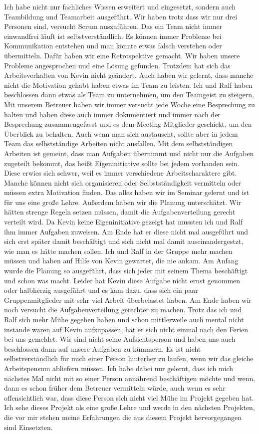 \noindent Ich habe nicht nur fachliches Wissen erweitert und eingesetzt, sondern auch Teambildung und Teamarbeit ausgeführt. Wir haben trotz dass wir nur drei Personen sind, versucht Scrum auszuführen.
Das ein Team nicht immer einwandfrei läuft ist selbstverständlich. 
Es können immer Probleme bei Kommunikation entstehen und man könnte etwas falsch verstehen oder übermitteln. 
Dafür haben wir eine Retrospektive gemacht. Wir haben unsere Probleme angesprochen und eine Lösung gefunden. Trotzdem hat sich das Arbeitsverhalten von Kevin nicht geändert.
Auch haben wir gelernt, dass manche nicht die Motivation gehabt haben etwas im Team zu leisten. Ich und Ralf haben beschlossen dann etwas als Team zu unternehmen, um den Teamgeist zu steigern. 
Mit unserem Betreuer haben wir immer versucht jede Woche eine Besprechung zu halten und haben diese auch immer dokumentiert und immer nach der Besprechung zusammengefasst und es dem Meeting Mitglieder geschickt, um den Überblick zu behalten. 
Auch wenn man sich austauscht, sollte aber in jedem Team das selbstständige Arbeiten nicht ausfallen. Mit dem selbstständigen Arbeiten ist gemeint, 
dass man Aufgaben übernimmt und nicht nur die Aufgaben zugeteilt bekommt, das heißt Eigeninitiative sollte bei jedem vorhanden sein. Diese erwies sich schwer, weil es immer verschiedene Arbeitscharaktere gibt. 
Manche können nicht sich organisieren oder Selbstständigkeit vermitteln oder müssen extra Motivation finden. Das alles haben wir im Seminar gelernt und ist für uns eine große Lehre.\newline
Außerdem haben wir die Planung unterschätzt. Wir hätten strenge Regeln setzen müssen, damit die Aufgabenverteilung gerecht verteilt wird. Da Kevin keine Eigeninitiative gezeigt hat mussten ich und Ralf
ihm immer Aufgaben zuweisen. Am Ende hat er diese nicht mal ausgeführt und sich erst später damit beschäftigt und sich nicht mal damit auseinandergestzt, wie man es hätte machen sollen.
Ich und Ralf in der Gruppe mehr machen müssen und haben auf Hilfe von Kevin gewartet, die nie ankam. Am Anfang wurde die Planung so ausgeführt, dass sich jeder mit seinem Thema beschäftigt und schon was macht. 
Leider hat Kevin diese Aufgabe nicht ernst genommen oder halbherzig ausgeführt und es kam dazu, dass sich ein paar Gruppenmitglieder mit sehr viel Arbeit überbelastet haben. Am Ende haben wir noch versucht die Aufgabenverteilung gerechter zu machen. 
Trotz das ich und Ralf sich mehr Mühe gegeben haben und schon mittlerweile auch mental nicht instande waren auf Kevin aufzupassen, hat er sich nicht einmal nach den Ferien bei uns gemeldet.
Wir sind nicht seine Aufsichtsperson und haben uns auch beschlossen dann auf unsere Aufgaben zu kümmern. Es ist nicht selbstverständlich für mich einer Person hinterher zu laufen,
wenn wir das gleiche Arbeitspensum abliefern müssen. Ich habe dabei nur gelernt, dass ich mich nächstes Mal nicht mit so einer Person annährend beschäftigen möchte und wenn, dann es schon früher
dem Betreuer vermitteln würde, auch wenn es sehr offensichtlich war, dass diese Person sich nicht viel Mühe im Projekt gegeben hat. 
Ich sehe dieses Projekt als eine große Lehre und werde in den nächsten Projekten, die vor mir stehen meine Erfahrungen die aus diesem Projekt hervorgegangen sind Einsetzten.

